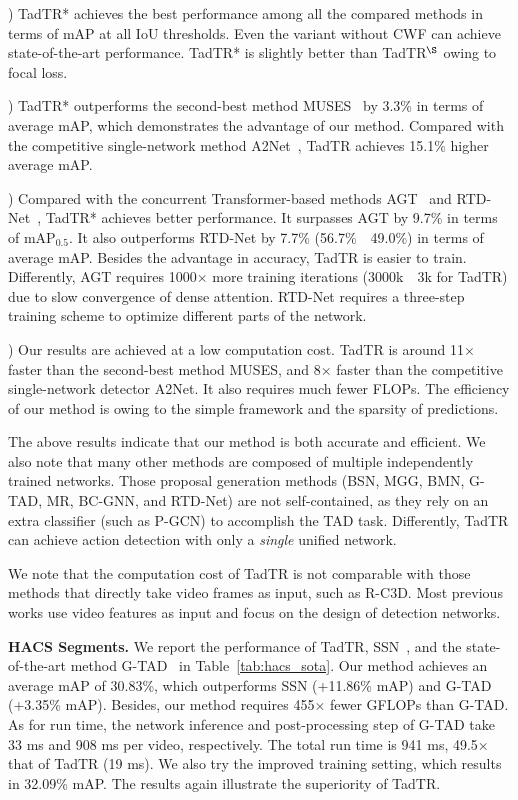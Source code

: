 \documentclass[lettersize,journal]{IEEEtran}
\begin{document}
) TadTR* achieves the best performance among all the compared methods in terms of mAP at all IoU thresholds. Even the variant without CWF can achieve state-of-the-art performance. TadTR* is slightly better than TadTR$^\S$ owing to focal loss.

) TadTR* outperforms the second-best method MUSES~\cite{Liu_2021_CVPR} by 3.3\% in terms of average mAP, which demonstrates the advantage of our method.
Compared with the competitive single-network method A2Net~\cite{yang2020revisiting}, TadTR achieves 15.1\% higher average mAP. 

) Compared with the concurrent Transformer-based methods AGT~\cite{nawhal2021activity} and RTD-Net~\cite{tan2021relaxed}, TadTR* achieves better performance. It surpasses AGT by 9.7\% in terms of mAP$_{0.5}$. It also outperforms RTD-Net by 7.7\% (56.7\%~\vs~49.0\%) in terms of average mAP. Besides the advantage in accuracy, TadTR is easier to train. Differently, AGT requires 1000$\times$ more training iterations (3000k~\vs~3k for TadTR) due to slow convergence of dense attention. RTD-Net requires a three-step training scheme to optimize different parts of the network.

) Our results are achieved at a low computation cost. 
TadTR is around 11$\times$ faster than the second-best method MUSES, 
and 8$\times$ faster than the competitive single-network detector A2Net. It also requires much fewer FLOPs. 
The efficiency of our method is owing to the simple framework and the sparsity of predictions.


The above results indicate that our method is both accurate and efficient. We also note that many other methods are composed of multiple independently trained networks. Those proposal generation methods (BSN, MGG, BMN, G-TAD, MR, BC-GNN, and RTD-Net) are not self-contained, as they rely on an extra classifier (such as P-GCN) to accomplish the TAD task. Differently, TadTR can achieve action detection with only a \textit{single} unified network.

We note that the computation cost of TadTR is  not comparable with those methods that directly take video frames as input, such as R-C3D. Most previous works use video features as input and focus on the design of detection networks.

\vspace{1ex}\noindent\textbf{HACS Segments.} 
We report the performance of TadTR, SSN~\cite{zhao2017temporal}, and the state-of-the-art method G-TAD~\cite{xu2020g} in Table~\ref{tab:hacs_sota}. 
Our method achieves an average mAP of 30.83\%, which outperforms SSN (+11.86\% mAP) and G-TAD (+3.35\% mAP). 
Besides, our method requires 455$\times$ fewer GFLOPs than G-TAD. As for run time, the network inference and post-processing step of G-TAD take 33 ms and 908 ms per video, respectively. The total run time is 941 ms, 49.5$\times$ that of TadTR (19 ms). 
We also try the improved training setting, which results in 32.09\% mAP.
The results again illustrate the superiority of TadTR.
\end{document}
